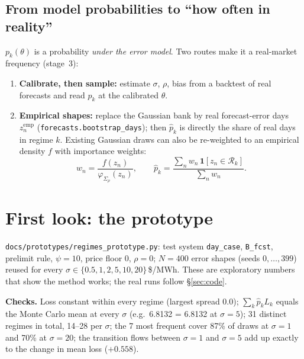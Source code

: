 \documentclass[10pt,a4paper]{article}
\newcommand{\code}[1]{\texttt{#1}}
\newcommand{\R}{\mathcal R}
\begin{document}
\subsection{From model probabilities to ``how often in reality''}
$p_k(\theta)$ is a probability \emph{under the error model}. Two routes make it a real-market frequency
(stage~3):
\begin{enumerate}
  \item \textbf{Calibrate, then sample:} estimate $\sigma$, $\rho$, bias from a backtest of real forecasts
    and read $p_k$ at the calibrated $\theta$.
  \item \textbf{Empirical shapes:} replace the Gaussian bank by real forecast-error days $z^{\text{emp}}_n$
    (\code{forecasts.bootstrap\_days}); then $\hat p_k$ is directly the share of real days in regime $k$.
    Existing Gaussian draws can also be re-weighted to an empirical density $f$ with importance weights:
    \[
    w_n=\frac{f(z_n)}{\varphi_{\Sigma_\rho}(z_n)},\qquad
    \hat p_k=\frac{\sum_n w_n\,\mathbf 1[z_n\in\R_k]}{\sum_nw_n}.
    \]
\end{enumerate}

\section{First look: the prototype}
\label{sec:proto}

\code{docs/prototypes/regimes\_prototype.py}: test system \code{day\_case}, \code{B\_fcst}, prelimit rule,
$\psi=10$, price floor 0, $\rho=0$; $N=400$ error shapes (seeds $0,\dots,399$) reused for every
$\sigma\in\{0.5,1,2,5,10,20\}$\,\$/MWh. These are exploratory numbers that show the method works; the real
runs follow \S\ref{sec:code}.

\textbf{Checks.} Loss constant within every regime (largest spread 0.0); $\sum_k\hat p_kL_k$ equals the
Monte Carlo mean at every $\sigma$ (e.g.\ 6.8132 = 6.8132 at $\sigma=5$); 31 distinct regimes in total,
14--28 per $\sigma$; the 7 most frequent cover 87\% of draws at $\sigma=1$ and 70\% at $\sigma=20$; the
transition flows between $\sigma=1$ and $\sigma=5$ add up exactly to the change in mean loss ($+0.558$).
\end{document}
